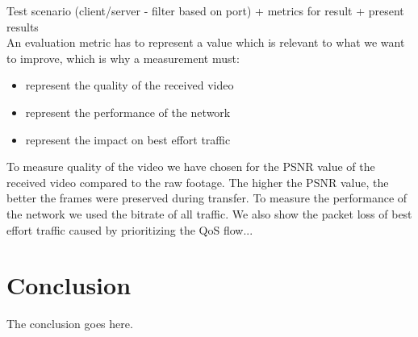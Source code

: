 \documentclass[conference]{IEEEtran}
\begin{document}
Test scenario (client/server - filter based on port) + metrics for result + present results\\
An evaluation metric has to represent a value which is relevant to what we want to improve, which is why a measurement must:
\begin{itemize}
	\item represent the quality of the received video
	\item represent the performance of the network
	\item represent the impact on best effort traffic
\end{itemize}
To measure quality of the video we have chosen for the PSNR value of the received video compared to the raw footage. The higher the PSNR value, the better the frames were preserved during transfer. To measure the performance of the network we used the bitrate of all traffic. We also show the packet loss of best effort traffic caused by prioritizing the QoS flow...



\section{Conclusion}
The conclusion goes here.







%
%
\end{document}
